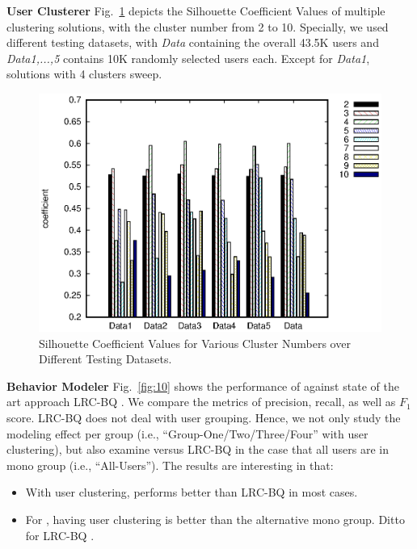 \textbf{User Clusterer}
%
Fig.\ \ref{fig:uc} depicts the Silhouette Coefficient Values of multiple clustering solutions, with the cluster number from 2 to 10.
Specially, we used different testing datasets, with \textit{Data} containing the overall 43.5K users and \textit{Data1,...,5} contains 10K randomly selected users each.
Except for \textit{Data1}, solutions with 4 clusters sweep.

\begin{figure}[!htb]
\centering
\includegraphics[width=.85\linewidth]{figures/clustering}
\caption{Silhouette Coefficient Values for Various Cluster Numbers over Different Testing Datasets.}
\label{fig:uc}
\end{figure}


\textbf{Behavior Modeler}
%
Fig.\ \ref{fig:10} shows the performance of \sys{} against state of the art approach LRC-BQ .
We compare the metrics of precision, recall, as well as $F_1$ score.
LRC-BQ  does not deal with user grouping.
Hence, we not only study the modeling effect per group (i.e., ``Group-One/Two/Three/Four'' with user clustering), but also examine \sys{} versus LRC-BQ  in the case that all users are in mono group (i.e., ``All-Users'').
The results are interesting in that:
\begin{itemize}
	\item With user clustering, \sys{} performs better than LRC-BQ  in most cases.
	\item For \sys{}, having user clustering is better than the alternative mono group. Ditto for LRC-BQ .
\end{itemize}



